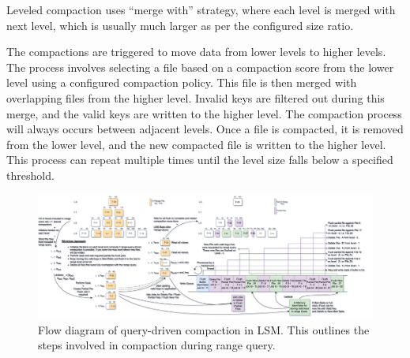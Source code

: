  Leveled compaction uses ``merge with'' strategy, where each level is merged with 
next level, which is usually much larger as per the configured size ratio.

The compactions are triggered to move data from lower levels to higher levels. The process involves selecting a file 
based on a compaction score from the lower level using a configured compaction policy. This file is then merged with 
overlapping files from the higher level. Invalid keys are filtered out during this merge, and the valid keys are 
written to the higher level. The compaction process will always occurs between adjacent levels. Once a file is compacted, 
it is removed from the lower level, and the new compacted file is written to the higher level. This process can repeat
multiple times until the level size falls below a specified threshold.

\begin{figure}
    \includegraphics[scale=0.10]{Figures/RQ-driven numeric key sorting.png}
    \caption{Flow diagram of query-driven compaction in LSM. This outlines the steps involved in compaction during range query.}\label{fig:query-driven_compaction}
\end{figure}